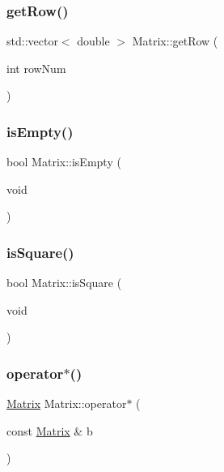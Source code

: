 \mbox{\label{class_matrix_a81f93e482ceaca5d013ab34b64ee3eb4}} 
\subsubsection{\texorpdfstring{get\+Row()}{getRow()}}
{\footnotesize\ttfamily std\+::vector$<$ double $>$ Matrix\+::get\+Row (\begin{DoxyParamCaption}\item[{int}]{row\+Num }\end{DoxyParamCaption})}

\mbox{\label{class_matrix_a8001c85cc9d6a706e659f972ea35ff93}} 
\subsubsection{\texorpdfstring{is\+Empty()}{isEmpty()}}
{\footnotesize\ttfamily bool Matrix\+::is\+Empty (\begin{DoxyParamCaption}\item[{void}]{ }\end{DoxyParamCaption})}

\mbox{\label{class_matrix_ae67c274d2425c1323a3a3356c174d071}} 
\subsubsection{\texorpdfstring{is\+Square()}{isSquare()}}
{\footnotesize\ttfamily bool Matrix\+::is\+Square (\begin{DoxyParamCaption}\item[{void}]{ }\end{DoxyParamCaption})\hspace{0.3cm}{\ttfamily [inline]}}

\mbox{\label{class_matrix_ac17891c37c77aabb69f2b82e15befb4d}} 
\subsubsection{\texorpdfstring{operator$\ast$()}{operator*()}\hspace{0.1cm}{\footnotesize\ttfamily [1/2]}}
{\footnotesize\ttfamily \mbox{\hyperlink{class_matrix}{Matrix}} Matrix\+::operator$\ast$ (\begin{DoxyParamCaption}\item[{const \mbox{\hyperlink{class_matrix}{Matrix}} \&}]{b }\end{DoxyParamCaption})}


